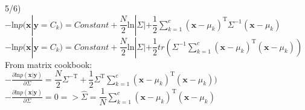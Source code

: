 \documentclass[submit]{harvardml}
\begin{document}
5/6)\\
$-\textrm{ln}p(\textbf{x}|\textbf{y} = C_k) =  Constant + \dfrac{N}{2}\textrm{ln}|\Sigma| + \dfrac{1}{2}\sum_{k=1}^{c}(\textbf{x}-\mu_k)^{\textrm{T}}\Sigma^{-1}(\textbf{x}-\mu_k)$\\
$-\textrm{ln}p(\textbf{x}|\textbf{y} = C_k) =  Constant + \dfrac{N}{2}\textrm{ln}|\Sigma| + \dfrac{1}{2}tr(\Sigma^{-1}\sum_{k=1}^{c}(\textbf{x}-\mu_k)^{\textrm{T}}(\textbf{x}-\mu_k))$\\
From matrix cookbook:\\

$-\frac{\partial \textrm{ln}p(\textbf{x}|\textbf{y})}{\partial \Sigma} =  \dfrac{N}{2}\Sigma^{-\textrm{T}} + \dfrac{1}{2}\Sigma^{\textrm{T}}\sum_{k=1}^{c}(\textbf{x}-\mu_k)^{\textrm{T}}(\textbf{x}-\mu_k))$\\
$-\frac{\partial \textrm{ln}p(\textbf{x}|\textbf{y})}{\partial \Sigma} = 0 => \hat{\Sigma} = \dfrac{1}{N}\sum_{k=1}^{c}(\textbf{x}-\mu_k)^{\textrm{T}}(\textbf{x}-\mu_k)$






\newpage
\end{document}
